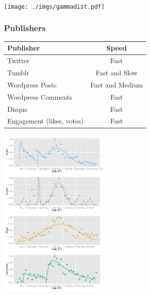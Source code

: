 \documentclass{beamer}
\begin{document}

\begin{frame}
  \begin{center}
   \texttt{[image: ./imgs/gammadist.pdf]}
  \end{center}
\end{frame}

\begin{frame} \frametitle{Publishers}
\begin{table}
\begin{tabular}{l|c}
\hline
   {Publisher}   &   {Speed} \\
\hline 
    Twitter      &    Fast  \\ 
    Tumblr      &        Fast and Slow \\
    Wordpress Posts &   Fast and Medium   \\
    Wordpress Comments & Fast\\
    Disqus       &    Fast\\
    Engagement (likes, votes) &  Fast\\
\hline
\end{tabular}
\end{table}
\end{frame}


\begin{frame}
  \begin{center}
    \includegraphics[height=8.5cm]{./imgs/JPMorgan.pdf}
  \end{center}
\end{frame}

\end{document}
